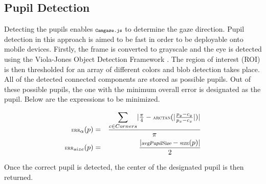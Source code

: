 \documentclass[annual]{acmsiggraph}
\newcommand{\Acronym}[1]{\ensuremath{{\small{\texttt{#1}}}}}
\newcommand{\Name}{\Acronym{Camgaze.js}}
\newcommand{\False}{\Constant{false}}
\newcommand{\True}{\Constant{true}}
\newcommand{\Symbol}[1]{\ensuremath{\mathcal{#1}}}
\newcommand{\Function}[1]{\ensuremath{{\small \textsc{#1}}}}
\newcommand{\Constant}[1]{\ensuremath{\small{\texttt{#1}}}}
\newcommand{\Var}[1]{\ensuremath{{\small{\textsl{#1}}}}}
\begin{document}
\subsection{Pupil Detection}

Detecting the pupils enables $\Name$ to determine the gaze direction.
Pupil detection in this approach is aimed to be fast in order to 
be deployable onto mobile devices. Firstly, the frame is converted to 
grayscale and the eye is detected using the Viola-Jones Object 
Detection Framework \cite{Viola01}. The region of interest (ROI) is
then thresholded for an array of different colors and blob detection
takes place. All of the detected connected components are stored as 
possible pupils. Out of these possible pupils, the one with the 
minimum overall error is designated as the pupil. Below are the 
expressions to be minimized.

\begin{eqnarray}
\Function{err}_{\alpha}(p) &=& \frac{
    \mathlarger{\sum}_{c \in Corners}{
        \vert 
            \frac{\pi}{4} - \Function{arctan}(
                \vert \frac{p_y - c_y}{p_x - c_x} \vert
            ) 
        \vert
    }
}{\pi} \\
\Function{err}_{size}(p) &=& \frac{
     \vert
        \Var{avgPupilSize} - \Function{size}(p)
    \vert
}{2}
\end{eqnarray}

Once the correct pupil is detected, the center of the designated pupil 
is then returned.

%
%
%
%
%
\end{document}

